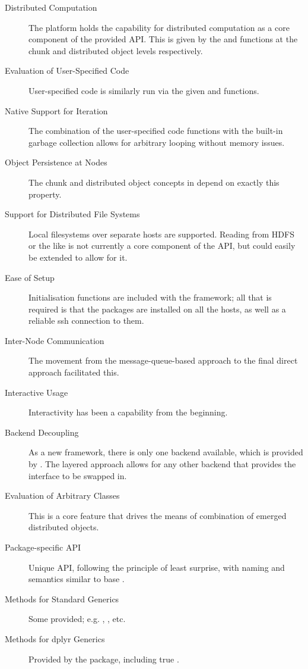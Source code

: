 \documentclass[letterpaper, inpress]{jds} %
\begin{document}
\begin{description}
\item[Distributed Computation] The  platform holds the capability for distributed computation as a core component of the provided API. This is given by the  and  functions at the chunk and distributed object levels respectively.
\item[Evaluation of User-Specified Code] User-specified code is similarly run via the given  and  functions.
\item[Native Support for Iteration] The combination of the user-specified code functions with the built-in garbage collection allows for arbitrary looping without memory issues.
\item[Object Persistence at Nodes] The chunk and distributed object concepts in  depend on exactly this property.
\item[Support for Distributed File Systems] Local filesystems over separate hosts are supported. Reading from HDFS or the like is not currently a core component of the API, but could easily be extended to allow for it.
\item[Ease of Setup] Initialisation functions are included with the framework; all that is required is that the  packages are installed on all the hosts, as well as a reliable ssh connection to them.
\item[Inter-Node Communication] The movement from the message-queue-based approach to the final direct approach facilitated this.
\item[Interactive Usage] Interactivity has been a capability from the beginning.
\item[Backend Decoupling] As a new framework, there is only one backend available, which is provided by . The layered approach allows for any other backend that provides the  interface to be swapped in.
\item[Evaluation of Arbitrary Classes] This is a core feature that drives the means of combination of emerged distributed objects.
\item[Package-specific API] Unique API, following the principle of least surprise, with naming and semantics similar to base .
\item[Methods for Standard Generics] Some provided; e.g. , , etc.
\item[Methods for dplyr Generics] Provided by the  package, including true .
\end{description}
\end{document}
